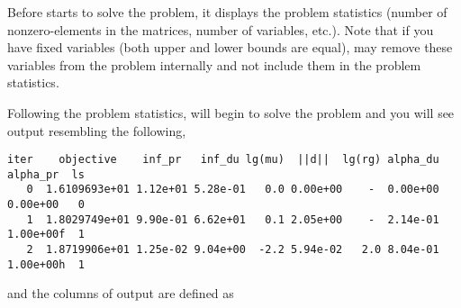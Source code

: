 Before \IPOPT starts to solve the problem, it displays the problem statistics (number of nonzero-elements in the matrices, number of variables, etc.).
Note that if you have fixed variables (both upper and lower bounds are equal), \IPOPT may remove these variables from the problem internally and not include them in the problem statistics.

Following the problem statistics, \IPOPT will begin to solve the problem and you will see output resembling the following,
\begin{verbatim}
iter    objective    inf_pr   inf_du lg(mu)  ||d||  lg(rg) alpha_du alpha_pr  ls
   0  1.6109693e+01 1.12e+01 5.28e-01   0.0 0.00e+00    -  0.00e+00 0.00e+00   0
   1  1.8029749e+01 9.90e-01 6.62e+01   0.1 2.05e+00    -  2.14e-01 1.00e+00f  1
   2  1.8719906e+01 1.25e-02 9.04e+00  -2.2 5.94e-02   2.0 8.04e-01 1.00e+00h  1
\end{verbatim}
and the columns of output are defined as
